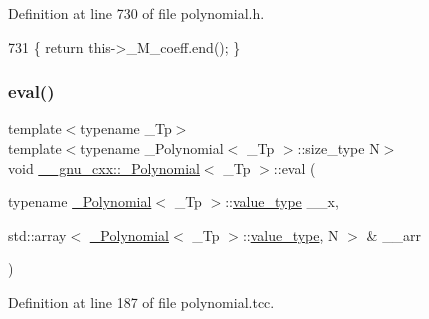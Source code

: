 Definition at line 730 of file polynomial.\+h.


\begin{DoxyCode}
731       \{ \textcolor{keywordflow}{return} this->\_M\_coeff.end(); \}
\end{DoxyCode}
\mbox{\label{class____gnu__cxx_1_1__Polynomial_a5558b16a9a4b594e506d30e5d10289b4}} 
\subsubsection{\texorpdfstring{eval()}{eval()}\hspace{0.1cm}{\footnotesize\ttfamily [1/4]}}
{\footnotesize\ttfamily template$<$typename \+\_\+\+Tp$>$ \\
template$<$typename \+\_\+\+Polynomial$<$ \+\_\+\+Tp $>$\+::size\+\_\+type N$>$ \\
void \hyperlink{class____gnu__cxx_1_1__Polynomial}{\+\_\+\+\_\+gnu\+\_\+cxx\+::\+\_\+\+Polynomial}$<$ \+\_\+\+Tp $>$\+::eval (\begin{DoxyParamCaption}\item[{typename \hyperlink{class____gnu__cxx_1_1__Polynomial}{\+\_\+\+Polynomial}$<$ \+\_\+\+Tp $>$\+::\hyperlink{class____gnu__cxx_1_1__Polynomial_a725563351f50e76084a7a016c06f8a53}{value\+\_\+type}}]{\+\_\+\+\_\+x,  }\item[{std\+::array$<$ \hyperlink{class____gnu__cxx_1_1__Polynomial}{\+\_\+\+Polynomial}$<$ \+\_\+\+Tp $>$\+::\hyperlink{class____gnu__cxx_1_1__Polynomial_a725563351f50e76084a7a016c06f8a53}{value\+\_\+type}, N $>$ \&}]{\+\_\+\+\_\+arr }\end{DoxyParamCaption})}



Definition at line 187 of file polynomial.\+tcc.


